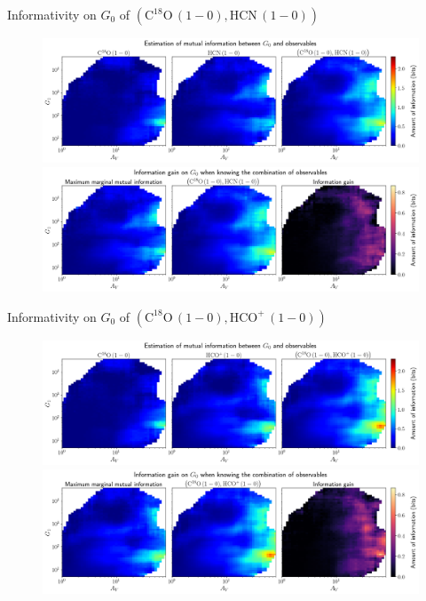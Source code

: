 \documentclass{beamer}
\begin{document}
\begin{frame}{Informativity on $G_0$ of $\left(\mathrm{C^{18}O\,(1-0)},\mathrm{HCN\,(1-0)}\right)$}
    \begin{figure}
        \centering
        \includegraphics[width=0.95\linewidth]{../mi/g0__c18o10_hcn10_mi.png}
        \vfill
        \includegraphics[width=0.95\linewidth]{../mi/g0__c18o10_hcn10_mi_gain.png}
    \end{figure}
\end{frame}

\begin{frame}{Informativity on $G_0$ of $\left(\mathrm{C^{18}O\,(1-0)},\mathrm{HCO^+\,(1-0)}\right)$}
    \begin{figure}
        \centering
        \includegraphics[width=0.95\linewidth]{../mi/g0__c18o10_hcop10_mi.png}
        \vfill
        \includegraphics[width=0.95\linewidth]{../mi/g0__c18o10_hcop10_mi_gain.png}
    \end{figure}
\end{frame}
\end{document}
